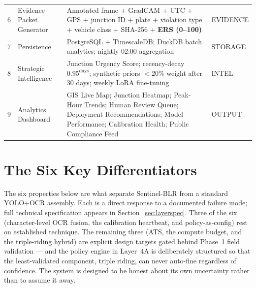 \documentclass[11pt,a4paper]{article}
\begin{document}
\begin{longtable}{C{1.2cm} L{3cm} L{6.8cm} L{2.5cm}}
    6 & Evidence Packet Generator & Annotated frame + GradCAM + UTC + GPS + junction ID + plate + violation type + vehicle class + SHA-256 + \textbf{ERS (0–100)} & EVIDENCE \\
    7 & Persistence & PostgreSQL + TimescaleDB; DuckDB batch analytics; nightly 02:00 aggregation & STORAGE \\
    8 & Strategic Intelligence & Junction Urgency Score; recency-decay $0.95^{\text{days}}$; synthetic priors $<$20\% weight after 30 days; weekly LoRA fine-tuning & INTEL \\
    9 & Analytics Dashboard & GIS Live Map; Junction Heatmap; Peak-Hour Trends; Human Review Queue; Deployment Recommendations; Model Performance; Calibration Health; Public Compliance Feed & OUTPUT \\
\end{longtable}

\section{The Six Key Differentiators}

\noindent The six properties below are what separate Sentinel-BLR from a standard YOLO+OCR assembly. Each is a direct response to a documented failure mode; full technical specification appears in Section~\ref{sec:layerspec}. Three of the six (character-level OCR fusion, the calibration heartbeat, and policy-as-config) rest on established technique. The remaining three (ATS, the compute budget, and the triple-riding hybrid) are explicit design targets gated behind Phase~1 field validation --- and the policy engine in Layer~4A is deliberately structured so that the least-validated component, triple riding, can never auto-fine regardless of confidence. The system is designed to be honest about its own uncertainty rather than to assume it away.
\end{document}
